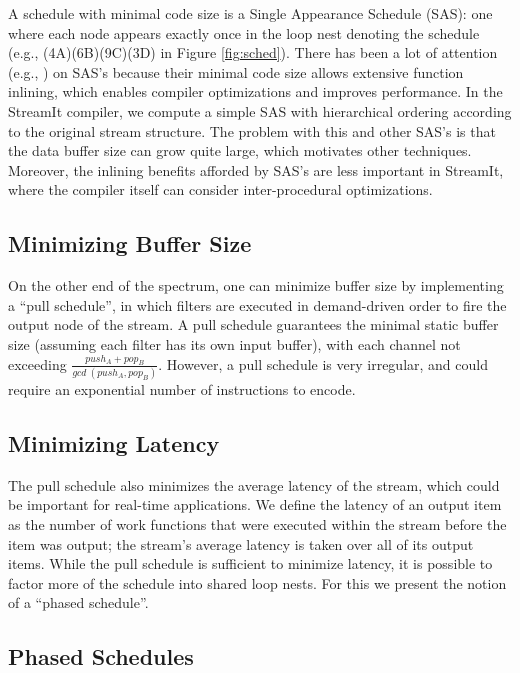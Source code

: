 A schedule with minimal code size is a Single Appearance Schedule
(SAS): one where each node appears exactly once in the loop nest
denoting the schedule (e.g., (4A)(6B)(9C)(3D) in Figure
\ref{fig:sched}).  There has been a lot of attention (e.g.,
\cite{bhattamurtlee97, leesdf}) on SAS's because their minimal code
size allows extensive function inlining, which enables compiler
optimizations and improves performance.  In the StreamIt compiler, we
compute a simple SAS with hierarchical ordering according to the
original stream structure.  The problem with this and other SAS's is
that the data buffer size can grow quite large, which motivates other
techniques.  Moreover, the inlining benefits afforded by SAS's are
less important in StreamIt, where the compiler itself can consider
inter-procedural optimizations.

\subsection{Minimizing Buffer Size}

On the other end of the spectrum, one can minimize buffer size by
implementing a ``pull schedule'', in which filters are executed in
demand-driven order to fire the output node of the stream.  A pull
schedule guarantees the minimal static buffer size (assuming each
filter has its own input buffer), with each channel not exceeding
$\frac{push_A + pop_B}{gcd~(push_A, pop_B)}$.  However, a pull
schedule is very irregular, and could require an exponential number of
instructions to encode.

\subsection{Minimizing Latency}

The pull schedule also minimizes the average latency of the stream,
which could be important for real-time applications.  We define the
latency of an output item as the number of work functions that were
executed within the stream before the item was output; the stream's
average latency is taken over all of its output items.  While the pull
schedule is sufficient to minimize latency, it is possible to factor
more of the schedule into shared loop nests.  For this we present the
notion of a ``phased schedule''.

\subsection{Phased Schedules}

